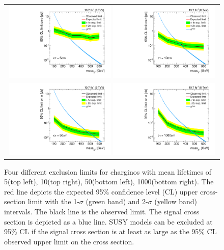 \begin{figure}[!h]
  \centering 
  \vspace{70pt}
  \begin{tabular}{c}
    \includegraphics[width=0.49\textwidth]{figures/analysis/Interpretation/ExclusionLimits/LimitPlot_ctau5cm.pdf} 
    \includegraphics[width=0.49\textwidth]{figures/analysis/Interpretation/ExclusionLimits/LimitPlot_ctau10cm.pdf} \\
    \includegraphics[width=0.49\textwidth]{figures/analysis/Interpretation/ExclusionLimits/LimitPlot_ctau50cm.pdf} 
    \includegraphics[width=0.49\textwidth]{figures/analysis/Interpretation/ExclusionLimits/LimitPlot_ctau1000cm.pdf} 
  \end{tabular}
  \caption{Four different \CLs exclusion limits for charginos with mean lifetimes of 5\cm (top left), 10\cm (top right), 50\cm (bottom left), 1000\cm (bottom right).
           The red line depicts the expected 95\% confidence level (CL) upper cross-section limit with the 1-$\sigma$ (green band) and 2-$\sigma$ (yellow band) intervals.
           The black line is the observed limit.
           The signal cross section is depicted as a blue line. 
           SUSY models can be excluded at 95\% CL if the signal cross section is at least as large as the 95\% CL observed upper limit on the cross section.}
  \label{fig:1dLimits}
\end{figure} 
